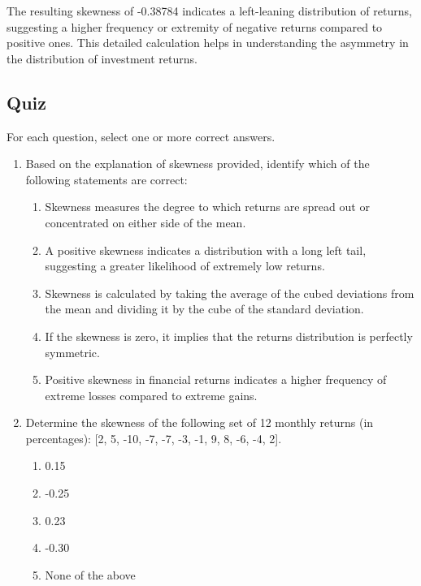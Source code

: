 \documentclass{article}
\begin{document}
The resulting skewness of -0.38784 indicates a left-leaning distribution of returns, suggesting a higher frequency or extremity of negative returns compared to positive ones. This detailed calculation helps in understanding the asymmetry in the distribution of investment returns.

\subsection{Quiz}
For each question, select one or more correct answers.

\begin{enumerate}
    \item Based on the explanation of skewness provided, identify which of the following statements are correct:
    \begin{enumerate}
        \item Skewness measures the degree to which returns are spread out or concentrated on either side of the mean.
        \item A positive skewness indicates a distribution with a long left tail, suggesting a greater likelihood of extremely low returns.
        \item Skewness is calculated by taking the average of the cubed deviations from the mean and dividing it by the cube of the standard deviation.
        \item If the skewness is zero, it implies that the returns distribution is perfectly symmetric.
        \item Positive skewness in financial returns indicates a higher frequency of extreme losses compared to extreme gains.
    \end{enumerate}

    \item Determine the skewness of the following set of 12 monthly returns (in percentages): [2, 5, -10, -7, -7, -3, -1, 9, 8, -6, -4, 2].
    \begin{enumerate}
        \item 0.15
        \item -0.25
        \item 0.23
        \item -0.30
        \item None of the above
    \end{enumerate}

\end{enumerate}

\clearpage
\end{document}
